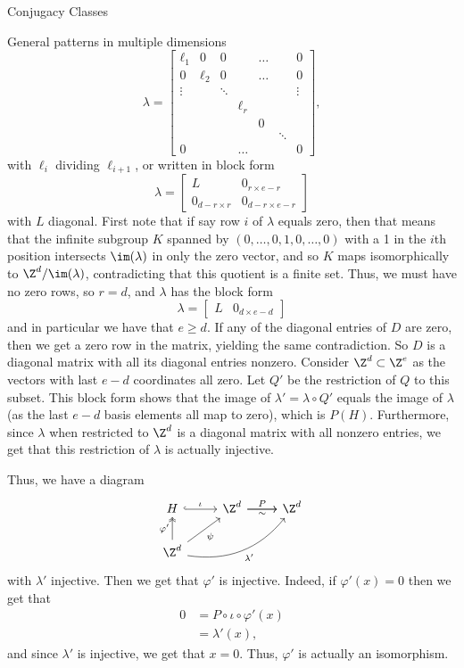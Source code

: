 \documentclass[12nt]{article}
\theoremstyle{plain}
\begin{document}
\begin{subsection}{Conjugacy Classes}
\begin{subsection}{General patterns in multiple dimensions}
\[
\lambda = \begin{bmatrix}
\ell_1 & 0 & 0 & & \dots & & 0 \\
0  & \ell_2 & 0 & & \dots & & 0 \\
\vdots  &  & \ddots  & & &  &\vdots \\
  &  &  &  \ell_r & \\
  &  &  &  & 0 \\
  &  &  &  &  & \ddots \\
 0 & &  & \dots & & & 0
\end{bmatrix},
\]
with $\ell_i$ dividing $\ell_{i+1}$,
or written in block form 
\[
\lambda = \begin{bmatrix}
 L & 0_{r \times e - r} \\
 0_{d - r \times r} & 0_{d-r \times e-r}
\end{bmatrix}
\]
with $L$ diagonal. First note that if say row $i$ of $\lambda$ equals zero, then that means that the infinite subgroup $K$ spanned by $(0, \dots, 0, 1, 0, \dots, 0)$ with a 1 in the $i$th position intersects $\im(\lambda)$ in only the zero vector, and so $K$ maps isomorphically to $\Z^d/\im(\lambda)$, contradicting that this quotient is a finite set. Thus, we must have no zero rows, so $r = d$, and $\lambda$ has the block form 
\[
\lambda = \begin{bmatrix}L & 0_{d \times {e - d}} \end{bmatrix}
\]
and in particular we have that $e \geq d$. If any of the diagonal entries of $D$ are zero, then we get a zero row in the matrix, yielding the same contradiction. So $D$ is a diagonal matrix with all its diagonal entries nonzero. Consider $\Z^{d} \subset \Z^e$ as the vectors with last $e - d$ coordinates all zero. Let $Q'$ be the restriction of $Q$ to this subset. This block form shows that the image of $\lambda' = \lambda \circ Q'$ equals the image of $\lambda$ (as the last $e - d$ basis elements all map to zero), which is $P(H)$. Furthermore, since $\lambda$ when restricted to $\Z^d$ is a diagonal matrix with all nonzero entries, we get that this restriction of $\lambda$ is actually injective. 

Thus, we have a diagram
\[
\begin{tikzcd}
H  \ar[r, hookrightarrow, "\iota"] & \Z^d \ar[r, "P"] \ar[r, "\sim"'] & \Z^d \\
\Z^d \ar[u, twoheadrightarrow, "\varphi'"] \ar[ur, "\psi"'] \ar[urr, bend right, "\lambda'"']
\end{tikzcd}
\]
with $\lambda'$ injective. Then we get that $\varphi'$ is injective. Indeed, if $\varphi'(x) = 0$ then we get that 
\begin{align*}
0 &= P \circ \iota \circ \varphi'(x) \\
	&= \lambda'(x),
\end{align*}
and since $\lambda'$ is injective, we get that $x = 0$. Thus, $\varphi'$ is actually an isomorphism. 


\end{subsection}
\end{subsection}
\end{document}
